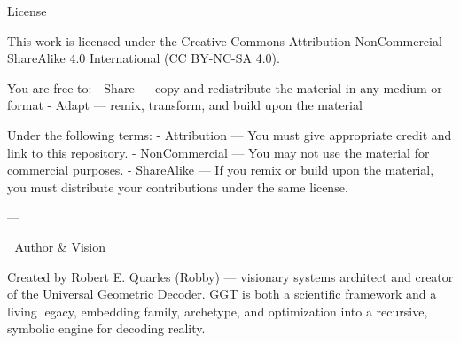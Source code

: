 License

This work is licensed under the Creative Commons Attribution-NonCommercial-ShareAlike 4.0 International (CC BY-NC-SA 4.0).

You are free to:
- Share — copy and redistribute the material in any medium or format
- Adapt — remix, transform, and build upon the material

Under the following terms:
- Attribution — You must give appropriate credit and link to this repository.
- NonCommercial — You may not use the material for commercial purposes.
- ShareAlike — If you remix or build upon the material, you must distribute your contributions under the same license.

---

🌌 Author & Vision

Created by Robert E. Quarles (Robby) — visionary systems architect and creator of the Universal Geometric Decoder. GGT is both a scientific framework and a living legacy, embedding family, archetype, and optimization into a recursive, symbolic engine for decoding reality.

